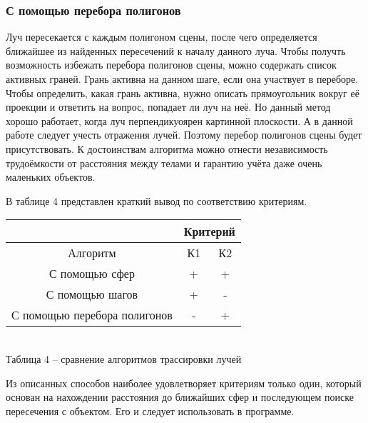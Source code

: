 {    \subsubsection{С помощью перебора полигонов} {
        Луч пересекается с каждым полигоном сцены, после чего определяется ближайшее
        из найденных пересечений к началу данного луча.
        Чтобы получть возможность избежать перебора полигонов сцены, можно содержать
        список активных граней.
        Грань активна на данном шаге, если она участвует в переборе.
        Чтобы определить, какая грань активна, нужно описать прямоугольник вокруг
        её проекции и ответить на вопрос, попадает ли луч на неё.
        Но данный метод хорошо работает, когда луч перпендикуоярен
        картинной плоскости.
        А в данной работе следует учесть отражения лучей.
        Поэтому перебор полигонов сцены будет присутствовать.
        К достоинствам алгоритма можно отнести независимость трудоёмкости от расстояния между телами и гарантию учёта даже очень маленьких объектов.
    }

    В таблице 4 представлен краткий вывод по соответствию критериям.
    
    \begin{center}
        \begin{tabular} { |c|c|c| }
            \hline
            \hspace{0pt} & \multicolumn{2}{|c|}{Критерий} \\
            \hline
            Алгоритм & К1 & К2 \\
            \hline
            С помощью сфер & + & + \\
            \hline
            С помощью шагов & + & - \\
            \hline
            С помощью перебора полигонов & - & + \\
            \hline
        \end{tabular}
        \\
    \vspace{2mm}
    \small { Таблица 4 -- сравнение алгоритмов трассировки лучей }
    \end{center}

    Из описанных способов наиболее удовлетворяет критериям только
    один, который основан на нахождении расстояния до ближайших сфер
    и последующем поиске пересечения с объектом.
    Его и следует использовать в программе.
}